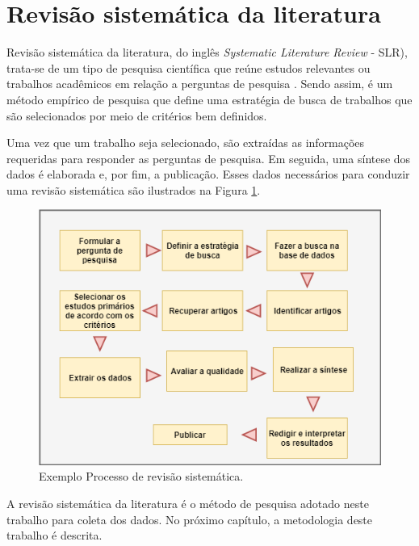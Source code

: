\section{Revisão sistemática da literatura} \label{sec:fund_slr}

Revisão sistemática da literatura, do inglês \emph{Systematic Literature Review} - SLR), trata-se de um tipo de pesquisa científica que reúne estudos relevantes ou trabalhos acadêmicos em relação a perguntas de pesquisa \cite{kitchenham}. Sendo assim, é um método empírico de pesquisa que define uma estratégia de busca de trabalhos que são selecionados por meio de critérios bem definidos.

Uma vez que um trabalho seja selecionado, são extraídas as informações requeridas para responder as perguntas de pesquisa. Em seguida, uma síntese dos dados é elaborada e, por fim, a publicação. Esses dados necessários para conduzir uma revisão sistemática são ilustrados na Figura \ref{fig:processoRevisao}.

\begin{figure}[h!]
	\caption{ Exemplo Processo de revisão sistemática.}
	\begin{center}
	    \includegraphics[scale=0.6]{figuras/sistematica.png}
	\end{center}
	\label{fig:processoRevisao}
\end{figure}



A revisão sistemática da literatura é o método de pesquisa adotado neste trabalho para coleta dos dados. No próximo capítulo, a metodologia deste trabalho é descrita.
